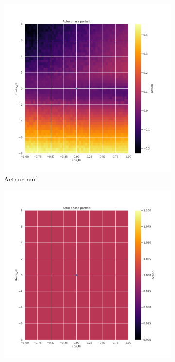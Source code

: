 \begin{figure}[H]
    \centering
    \begin{subfigure}{0.3\textwidth}
        \includegraphics[width=\textwidth]{figures/prelimaire/0_actor_discount__ante_Pendulum-v0.pdf}
        \caption{Acteur naïf}
    \end{subfigure}
    \begin{subfigure}{0.3\textwidth}
        \includegraphics[width=\textwidth]{figures/prelimaire/0_actor_discount__post_Pendulum-v0.pdf}

\end{subfigure}
\end{figure}
